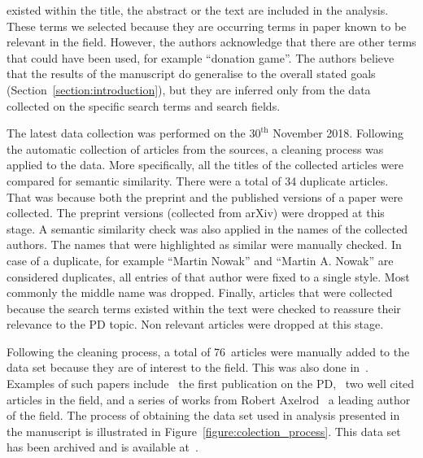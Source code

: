 \documentclass{article}
\theoremstyle{definition}
\newcommand{\manual}{76}
\begin{document}
existed within the title, the abstract or the text are included in the analysis.
These terms we selected because they are occurring terms in paper known to be
relevant in the field. However, the authors acknowledge that there are other
terms that could have been used, for example ``donation game''. The authors believe
that the results of the manuscript do generalise to the overall stated goals
(Section~\ref{section:introduction}), but they are inferred only from
the data collected on the specific search terms and search fields.

The latest data collection was performed on the \(30^{\text{th}}\) November
2018. Following the automatic collection of articles from the sources, a
cleaning process was applied to the data. More specifically, all the titles of
the collected articles were compared for semantic similarity. There were a total
of 34 duplicate articles. That was because both the preprint and the published
versions of a paper were collected. The preprint versions
(collected from arXiv) were dropped at this stage. A semantic similarity check
was also applied in the names of the collected authors. The names that were
highlighted as similar were manually checked. In case of a duplicate, for
example ``Martin Nowak'' and ``Martin A. Nowak'' are considered duplicates, all
entries of that author were fixed to a single style. Most commonly the middle
name was dropped. Finally, articles that were collected because the search terms
existed within the text were checked to reassure their relevance to the PD
topic. Non relevant articles were dropped at this stage. 

Following the cleaning process, a total of \manual~articles were manually added
to the data set because they are of interest to the field. This was also done
in~\citep{Liu2015}. Examples of such papers include~\citep{Flood1958} the first publication on the
PD,~\citep{Ohtsuki2006, Stewart2012} two well cited articles in the field, and a
series of works from Robert Axelrod~\citep{Axelrod1980, Axelrod1980more,
Axelrod1987, Axelrod1981, Riolo2001} a leading author of the field.
The process of obtaining the data set used in analysis presented in the
manuscript is illustrated in Figure~\ref{figure:colection_process}.
This data set has been archived and is available at~\citep{pd_data_2018}.
\end{document}

